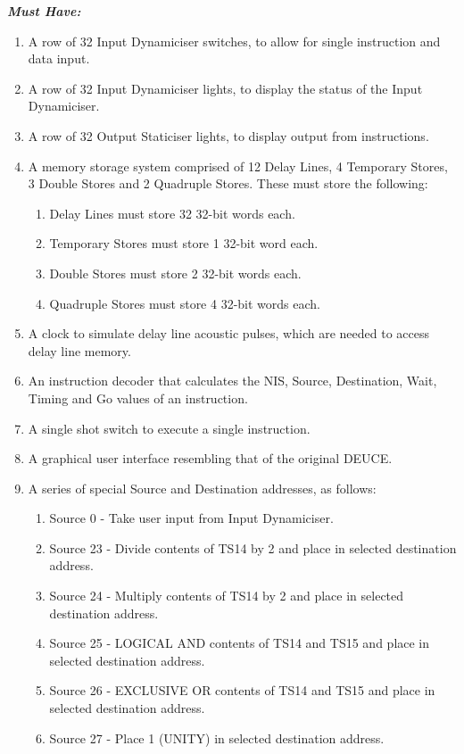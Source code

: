 \documentclass{l4proj}
\begin{document}
\textbf{\textit{Must Have:}}
\begin{enumerate}
	\item A row of 32 Input Dynamiciser switches, to allow for single instruction and data input.
	\item A row of 32 Input Dynamiciser lights, to display the status of the Input Dynamiciser.
	\item A row of 32 Output Staticiser lights, to display output from instructions.
	\item A memory storage system comprised of 12 Delay Lines, 4 Temporary Stores, 3 Double Stores and 2 Quadruple Stores. These must store the following:
	\begin{enumerate}
		\item Delay Lines must store 32 32-bit words each.
		\item Temporary Stores must store 1 32-bit word each.
		\item Double Stores must store 2 32-bit words each.
		\item Quadruple Stores must store 4 32-bit words each.
	\end{enumerate}
	\item A clock to simulate delay line acoustic pulses, which are needed to access delay line memory.
	\item An instruction decoder that calculates the NIS, Source, Destination, Wait, Timing and Go values of an instruction.
	\item A single shot switch to execute a single instruction.
	\item A graphical user interface resembling that of the original DEUCE.
	\item A series of special Source and Destination addresses, as follows:
	\begin{enumerate}
		\item Source 0 - Take user input from Input Dynamiciser.
		\item Source 23 - Divide contents of TS14 by 2 and place in selected destination address.
		\item Source 24 - Multiply contents of TS14 by 2 and place in selected destination address.
		\item Source 25 - LOGICAL AND contents of TS14 and TS15 and place in selected destination address.
		\item Source 26 - EXCLUSIVE OR contents of TS14 and TS15 and place in selected destination address.
		\item Source 27 - Place 1 (UNITY) in selected destination address.

\end{enumerate}
\end{enumerate}
\end{document}

